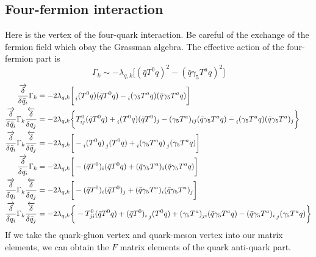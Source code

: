 \documentclass[UTF8]{article}
\begin{document}
\subsection{Four-fermion interaction}
Here is the vertex of the four-quark interaction. Be careful of the exchange of the fermion field which obay the Grassman algebra. The effective action of the four-fermion part is
\begin{equation}
\Gamma_k \sim -\lambda_{q,k}\bigg[ (\bar{q}T^0q)^2-(\bar{q}\gamma_5T^aq)^2 \bigg]
\end{equation}
\begin{equation}
\begin{split}
\frac{\overrightarrow{\delta}}{\delta\bar{q}_i}\Gamma_k&=-2\lambda_{q,k}\bigg[\prescript{}{i}(T^0q)(\bar{q}T^0q)-\prescript{}{i}(\gamma_5T^aq)(\bar{q}\gamma_5T^aq)\bigg]\\
\frac{\overrightarrow{\delta}}{\delta\bar{q}_i}\Gamma_k\frac{\overleftarrow{\delta}}{\delta q_j}&=-2\lambda_{q,k}\bigg\{T^0_{ij}(\bar{q}T^0q)+\prescript{}{i}(T^0q)(\bar{q}T^0)_j-(\gamma_5T^a)_{ij}(\bar{q}\gamma_5T^aq)-\prescript{}{i}(\gamma_5T^aq)(\bar{q}\gamma_5T^a)_j\bigg\}\\
\frac{\overrightarrow{\delta}}{\delta\bar{q}_i}\Gamma_k\frac{\overleftarrow{\delta}}{\delta \bar{q}_j}
&=-2\lambda_{q,k}\bigg[-\prescript{}{i}(T^0q)\prescript{}{j}(T^0q)+\prescript{}{i}(\gamma_5T^aq)\prescript{}{j}(\gamma_5T^aq)\bigg]\\
\frac{\overrightarrow{\delta}}{\delta q_i}\Gamma_k&=-2\lambda_{q,k}\bigg[-(\bar{q}T^0)_i(\bar{q}T^0q)+(\bar{q}\gamma_5T^a)_i(\bar{q}\gamma_5T^aq)\bigg]\\
\frac{\overrightarrow{\delta}}{\delta q_i}\Gamma_k\frac{\overleftarrow{\delta}}{\delta q_j}
&=-2\lambda_{q,k}\bigg[-(\bar{q}T^0)_i(\bar{q}T^0)_j+(\bar{q}\gamma_5T^a)_i(\bar{q}\gamma_5T^a)_j\bigg]\\
\frac{\overrightarrow{\delta}}{\delta q_i}\Gamma_k\frac{\overleftarrow{\delta}}{\delta \bar{q}_j}
&=-2\lambda_{q,k}\bigg\{-T^0_{ji}(\bar{q}T^0q)+(\bar{q}T^0)_i\prescript{}{j}(T^0q)+(\gamma_5T^a)_{ji}(\bar{q}\gamma_5T^aq)-(\bar{q}\gamma_5T^a)_i\prescript{}{j}(\gamma_5T^aq)\bigg\}\\
\end{split}
\end{equation}
If we take the quark-gluon vertex and quark-meson vertex into our matrix elements, we can obtain the $F$ matrix elements of the quark anti-quark part.
\end{document}
